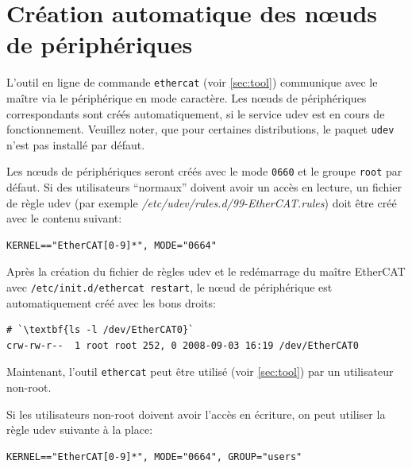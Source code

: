 \documentclass[a4paper,12pt,BCOR=6mm,bibtotoc,idxtotoc]{scrbook}
\begin{document}
\section{Cr\'eation automatique des n\oe{}uds de p\'eriph\'eriques}
\label{sec:autonode}

L'outil en ligne de commande \lstinline+ethercat+ (voir
\autoref{sec:tool}) communique avec le ma\^itre via le
p\'eriph\'erique en mode caract\`ere.  Les n\oe{}uds de
p\'eriph\'eriques correspondants sont cr\'e\'es automatiquement, si le
service udev est en cours de fonctionnement.  Veuillez noter, que pour
certaines distributions, le paquet \lstinline+udev+ n'est pas
install\'e par d\'efaut.

Les n\oe{}uds de p\'eriph\'eriques seront cr\'e\'es avec le mode
\lstinline+0660+ et le groupe \lstinline+root+ par d\'efaut. Si des
utilisateurs ``normaux'' doivent avoir un acc\`es en lecture, un
fichier de r\`egle udev (par exemple
\textit{/etc/udev/rules.d/99-EtherCAT.rules}) doit \^etre cr\'e\'e
avec le contenu suivant:


\begin{lstlisting}
KERNEL=="EtherCAT[0-9]*", MODE="0664"
\end{lstlisting}

Apr\`es la cr\'eation du fichier de r\`egles udev et le red\'emarrage
du ma\^itre EtherCAT avec
\lstinline[breaklines=true]+/etc/init.d/ethercat restart+, le n\oe{}ud
de p\'eriph\'erique est automatiquement cr\'e\'e avec les bons droits:

\begin{lstlisting}
# `\textbf{ls -l /dev/EtherCAT0}`
crw-rw-r--  1 root root 252, 0 2008-09-03 16:19 /dev/EtherCAT0
\end{lstlisting}

Maintenant, l'outil \lstinline+ethercat+ peut \^etre utilis\'e (voir
\autoref{sec:tool}) par un utilisateur non-root.

Si les utilisateurs non-root doivent avoir l'acc\`es en \'ecriture, on
peut utiliser la r\`egle udev suivante \`a la place:

\begin{lstlisting}
KERNEL=="EtherCAT[0-9]*", MODE="0664", GROUP="users"
\end{lstlisting}

\end{document}
